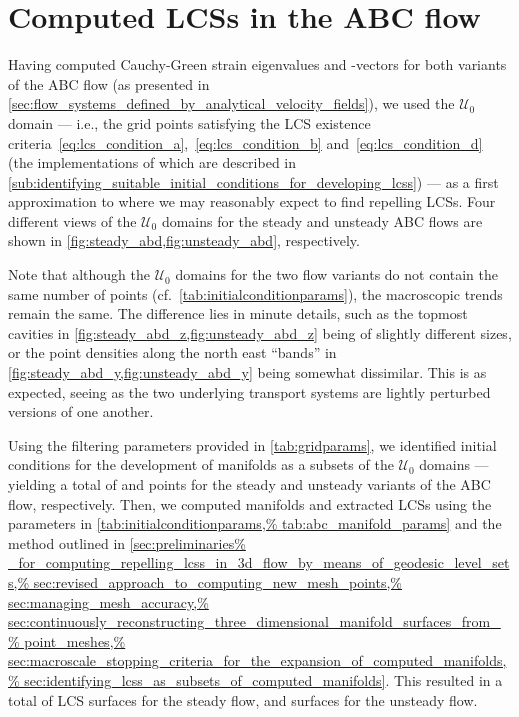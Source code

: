 \section{Computed LCSs in the ABC flow}
\label{sec:computed_lcss_in_the_abc_flow}

Having computed Cauchy-Green strain eigenvalues and -vectors for both
variants of the ABC flow (as presented in
\cref{sec:flow_systems_defined_by_analytical_velocity_fields}), we used
the $\mathcal{U}_{0}$ domain --- i.e., the grid points satisfying the LCS
existence criteria~\eqref{eq:lcs_condition_a},~\eqref{eq:lcs_condition_b}
and~\eqref{eq:lcs_condition_d} (the implementations of which are
described in
\cref{sub:identifying_suitable_initial_conditions_for_developing_lcss}) --- as
a first approximation to where we may reasonably expect to find repelling LCSs.
Four different views of the $\mathcal{U}_{0}$ domains for the steady
and unsteady ABC flows are shown in \cref{fig:steady_abd,fig:unsteady_abd},
respectively.





Note that although the $\mathcal{U}_{0}$ domains for the two
flow variants do not contain the same number of points (cf.\
\cref{tab:initialconditionparams}), the macroscopic trends remain the same. The
difference lies in minute details, such as the topmost cavities in
\cref{fig:steady_abd_z,fig:unsteady_abd_z} being of slightly different sizes,
or the point densities along the north east ``bands'' in
\cref{fig:steady_abd_y,fig:unsteady_abd_y} being somewhat dissimilar. This is
as expected, seeing as the two underlying transport systems are lightly
perturbed versions of one another.

Using the filtering parameters provided in \cref{tab:gridparams}, we identified
initial conditions for the development of manifolds as a subsets of the
$\mathcal{U}_{0}$ domains --- yielding a total of \numprint{618} and
\numprint{676} points for the steady and unsteady variants of the ABC flow,
respectively.  Then, we computed manifolds and extracted LCSs using the
parameters in \cref{tab:initialconditionparams,%
tab:abc_manifold_params} and the method outlined in \cref{sec:preliminaries%
_for_computing_repelling_lcss_in_3d_flow_by_means_of_geodesic_level_sets,%
    sec:revised_approach_to_computing_new_mesh_points,%
    sec:managing_mesh_accuracy,%
    sec:continuously_reconstructing_three_dimensional_manifold_surfaces_from_%
    point_meshes,%
    sec:macroscale_stopping_criteria_for_the_expansion_of_computed_manifolds,%
    sec:identifying_lcss_as_subsets_of_computed_manifolds}. This resulted
in a total of \numprint{22} LCS surfaces for the steady flow, and
\numprint{31} surfaces for the unsteady flow.

